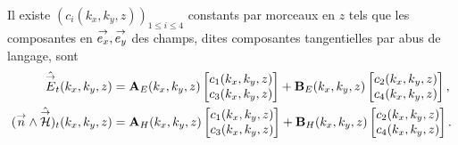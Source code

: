      \begin{prop}
          Il existe \((c_i(k_x,k_y,z))_{1\le i \le4}\) constants par morceaux en \(z\) tels que les composantes en \({\overset{\rightarrow}{e_x}},{\overset{\rightarrow}{e_y}}\) des champs, dites composantes tangentielles par abus de langage, sont
          \begin{align*}
              \hat{{\overset{\rightarrow}{E}}}_t(k_x,k_y,z) &= \mathbf{A}_E(k_x,k_y,z) \begin{bmatrix}c_1(k_x,k_y,z) \\ c_3(k_x,k_y,z)\end{bmatrix} + \mathbf{B}_E(k_x,k_y,z) \begin{bmatrix}c_2(k_x,k_y,z) \\ c_4(k_x,k_y,z)\end{bmatrix},
              \\
              ({\overset{\rightarrow}{n}} \wedge \hat{{\overset{\rightarrow}{\mathcal{H}}}})_t(k_x,k_y,z) &= \mathbf{A}_H(k_x,k_y,z) \begin{bmatrix}c_1(k_x,k_y,z) \\ c_3(k_x,k_y,z)\end{bmatrix} + \mathbf{B}_H(k_x,k_y,z) \begin{bmatrix}c_2(k_x,k_y,z) \\ c_4(k_x,k_y,z)\end{bmatrix}.
          \end{align*}
      \end{prop}

